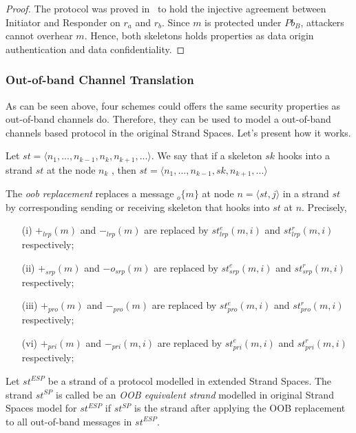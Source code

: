 \begin{proof}
The protocol was proved in~\cite{674832} to hold the injective agreement between Initiator and Responder on $r_a$ and $r_b$. Since $m$ is protected under $Pb_B$, attackers cannot overhear $m$. Hence, both skeletons holds properties as data origin authentication and data confidentiality.
\end{proof}

\subsubsection*{Out-of-band Channel Translation}

As can be seen above, four schemes could offers the same security properties as out-of-band channels do. Therefore, they can be used to model a out-of-band channels based protocol in the original Strand Spaces. Let's present how it works. 

Let $st = \langle n_1,...,n_{k-1},n_k,n_{k+1},... \rangle$. We say that if a skeleton $sk$ hooks into a strand $st$ at the node $n_k$ , then $st = \langle n_1,...,n_{k-1},sk,n_{k+1},... \rangle$

\begin{Definition}\label{eos}
The \emph{oob replacement} replaces a message $_o\{m\}$ at node $n=\langle st,j \rangle$ in a strand $st$ by corresponding sending or receiving skeleton that hooks into $st$ at $n$. Precisely, 

\begin{enumerate}
\item [(i)] $+_{lrp}(m)$ and $-_{lrp}(m)$ are replaced by $st^e_{lrp}(m,i)$ and $st^r_{lrp}(m,i)$ respectively;
\item [(ii)] $+_{srp}(m)$ and $-o_{srp}(m)$ are replaced by $st^e_{srp}(m,i)$ and $st^r_{srp}(m,i)$ respectively;
\item [(iii)] $+_{pro}(m)$ and $-_{pro}(m)$ are replaced by $st^e_{pro}(m,i)$ and $st^r_{pro}(m,i)$ respectively;
\item [(vi)] $+_{pri}(m)$ and $-_{pri}(m,i)$ are replaced by $st^e_{pri}(m,i)$ and $st^r_{pri}(m,i)$ respectively;\end{enumerate}
\end{Definition}

\begin{Definition} Let $st^{ESP}$ be a strand of a protocol modelled in extended Strand Spaces. The strand $st^{SP}$ is called be an \emph{OOB equivalent strand} modelled in original Strand Spaces model for $st^{ESP}$ if $st^{SP}$ is the strand after applying the OOB replacement to all out-of-band messages in $st^{ESP}$.
\end{Definition}

